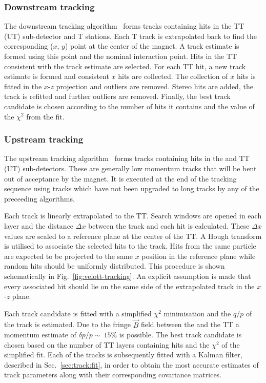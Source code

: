 \subsubsection{Downstream tracking}
\label{sec:track:algos:downstream}

The downstream tracking algorithm~\cite{patdownstream,sascha} forms tracks containing hits in the TT (UT) sub-detector and T stations. Each T track is extrapolated back to find the corresponding ($x$, $y$) point at the center of the magnet. A track estimate is formed using this point and the nominal interaction point. Hits in the TT consistent with the track estimate are selected. For each TT hit, a new track estimate is formed and consistent $x$ hits are collected. The collection of $x$ hits is fitted in the $x$-$z$ projection and outliers are removed. Stereo hits are added, the track is refitted and further outliers are removed. Finally, the best track candidate is chosen according to the number of hits it contains and the value of the $\chi^{2}$ from the fit.


\subsubsection{Upstream tracking}
\label{sec:track:algos:upstream}

The upstream tracking algorithm~\cite{patvelott} forms tracks containing hits in the \velo and TT (UT) sub-detectors. These are generally low momentum tracks that will be bent out of acceptance by the magnet. It is executed at the end of the tracking sequence using \velo tracks which have not been upgraded to long tracks by any of the preceeding algorithms. 

Each \velo track is linearly extrapolated to the TT. Search windows are opened in each layer and the distance $\Delta x$ between the track and each hit is calculated. These $\Delta x$ values are scaled to a reference plane at the center of the TT. A Hough transform is utilised to associate the selected hits to the \velo track. Hits from the same particle are expected to be projected to the same $x$ position in the reference plane while random hits should be uniformly distributed. This procedure is shown schematically in Fig.~\ref{fig:velott-tracking}. An explicit assumption is made that every associated hit should lie on the same side of the extrapolated \velo track in the $x$-$z$ plane. 

 Each track candidate is fitted with a simplified $\chi^{2}$ minimisation and the $q/p$ of the track is estimated. Due to the fringe $\vec{B}$ field between the \velo and the TT a momentum estimate of $\delta p/p \sim~15\%$ is possible. The best track candidate is chosen based on the number of TT layers containing hits and the $\chi^{2}$ of the simplified fit. Each of the \velott tracks is subsequently fitted with a Kalman filter, described in Sec.~\ref{sec:track:fit}, in order to obtain the most accurate estimates of track parameters along with their corresponding covariance matrices.

